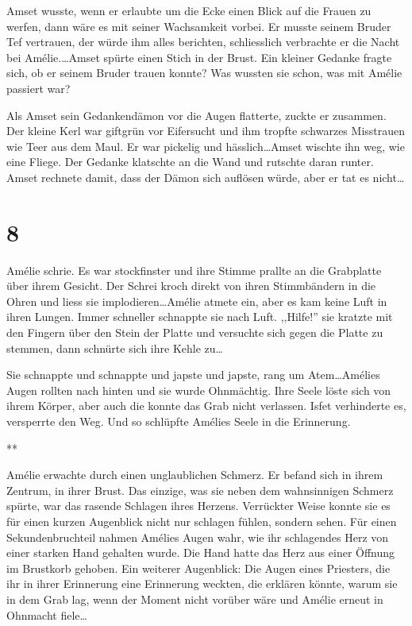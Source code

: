 \documentclass[11pt,titlepage,a5paper]{book}
\newcommand{\sterne}{\par{\centering ***\par}}
\begin{document}
 Amset wusste, wenn er erlaubte um die Ecke einen Blick auf die Frauen zu werfen, dann wäre es mit seiner Wachsamkeit vorbei. Er musste seinem Bruder Tef vertrauen, der würde ihm alles berichten, schliesslich verbrachte er die Nacht bei Amélie.\dots Amset spürte einen Stich in der Brust. Ein kleiner Gedanke fragte sich, ob er seinem Bruder trauen konnte? Was wussten sie schon, was mit Amélie passiert war?

Als Amset sein Gedankendämon vor die Augen flatterte, zuckte er zusammen. Der kleine Kerl war giftgrün vor Eifersucht und ihm  tropfte schwarzes Misstrauen wie Teer aus dem Maul. Er war pickelig und hässlich\dots Amset wischte ihn weg, wie  eine Fliege. Der Gedanke klatschte an die Wand und rutschte daran runter. Amset rechnete damit, dass der Dämon sich auflösen würde, aber er tat es nicht\dots

\section*{8}

Amélie schrie. Es war stockfinster und ihre Stimme prallte an die Grabplatte über ihrem Gesicht. Der Schrei kroch direkt von ihren Stimmbändern in die Ohren und liess sie implodieren\dots Amélie atmete ein, aber es kam keine Luft in ihren Lungen. Immer schneller schnappte sie nach Luft. ,,Hilfe!'' sie kratzte mit den Fingern über den Stein der Platte und versuchte sich gegen die Platte zu stemmen, dann schnürte sich ihre Kehle zu\dots

Sie schnappte und schnappte und japste und japste, rang um Atem\dots Amélies Augen rollten nach hinten und sie wurde Ohnmächtig. Ihre Seele löste sich von ihrem Körper, aber auch die konnte das Grab nicht verlassen. Isfet verhinderte es, versperrte den Weg. Und so schlüpfte Amélies Seele in die Erinnerung.

\sterne

Amélie erwachte durch einen unglaublichen Schmerz. Er befand sich in ihrem Zentrum, in ihrer Brust. Das einzige, was sie neben dem wahnsinnigen Schmerz spürte, war das rasende Schlagen ihres Herzens. Verrückter Weise konnte sie es für einen kurzen Augenblick nicht nur schlagen fühlen, sondern sehen. Für einen Sekundenbruchteil nahmen Amélies Augen wahr, wie ihr schlagendes Herz von einer starken Hand gehalten wurde. Die Hand hatte das Herz aus einer Öffnung im Brustkorb gehoben. Ein weiterer Augenblick: Die Augen eines Priesters, die ihr in ihrer Erinnerung eine Erinnerung weckten, die erklären könnte, warum sie in dem Grab lag, wenn der Moment nicht vorüber wäre und Amélie erneut in Ohnmacht fiele\dots
\end{document}
